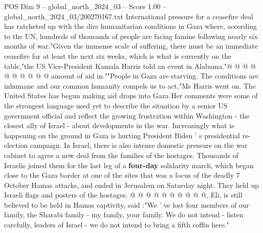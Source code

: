 \begin{textsample}{POS Dim 9 – global\_north\_2024\_03 – Score 1.00 – global\_north\_2024\_03/200270167.txt}
International pressure for a ceasefire deal has ratcheted up with the dire humanitarian conditions in Gaza where, according to the UN, hundreds of thousands of people are facing famine following nearly six months of war."Given the immense scale of suffering, there must be an immediate ceasefire for at least the next six weeks, which is what is currently on the table,"the US Vice-President Kamala Harris told an event in Alabama."@ @ @ @ @ @ @ @ @ @ amount of aid in.""People in Gaza are starving.
The conditions are inhumane and our common humanity compels us to act,"Ms Harris went on.
The United States has begun making aid drops into Gaza Her comments were some of the strongest language used yet to describe the situation by a senior US government official and reflect the growing frustration within Washington - the closest ally of Israel - about developments in the war.
Increasingly what is happening on the ground in Gaza is hurting President Biden ' s presidential re-election campaign.
In Israel, there is also intense domestic pressure on the war cabinet to agree a new deal from the families of the hostages.
Thousands of Israelis joined them for the last leg of a \textbf{four-day} solidarity march, which began close to the Gaza border at one of the sites that was a focus of the deadly 7 October Hamas attacks, and ended in Jerusalem on Saturday night.
They held up Israeli flags and posters of the hostages. @ @ @ @ @ @ @ @ @ @, Eli, is still believed to be held in Hamas captivity, said :"We ' ve lost four members of our family, the Sharabi family - my family, your family.
We do not intend - listen carefully, leaders of Israel - we do not intend to bring a fifth coffin here."

\end{textsample}
